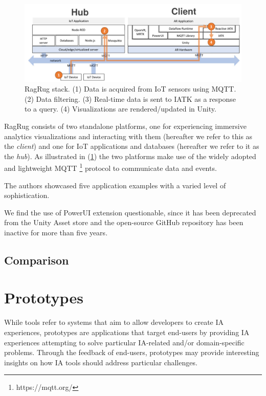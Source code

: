 \documentclass{vgtc}                          %
\begin{document}
\begin{figure}[tb]
	\centering
	\includegraphics[width=\columnwidth]{ragrug_stack}
	\caption[Caption for RagRug]{RagRug stack. (1) Data is acquired from IoT
		sensors using MQTT. (2) Data filtering. (3) Real-time data is sent to
		IATK as a response to a query. (4) Visualizations are
		rendered/updated in Unity.}
	\label{fig:ragrug_stack}
\end{figure}

\medskip

\noindent RagRug consists of two standalone platforms, one for experiencing
immersive analytics visualizations and interacting with them (hereafter we
refer to this as the \textit{client}) and one for IoT applications and
databases (hereafter we refer to it as the \textit{hub}). As illustrated
in (\cref{fig:ragrug_stack}) the two platforms make use of the widely adopted
and lightweight MQTT \footnote{https://mqtt.org/} protocol to communicate
data and events.

\medskip

\noindent The authors showcased five application examples with a varied level of
sophistication.

We find the use of PowerUI extension questionable, since it has been deprecated
from the Unity Asset store and the open-source GitHub repository has been
inactive for more than five years.

\subsection{Comparison}

\section{Prototypes}

While tools refer to systems that aim to allow developers to create IA
experiences, prototypes are applications that target end-users by providing IA
experiences attempting to solve particular IA-related and/or domain-specific
problems. Through the feedback of end-users, prototypes may provide interesting
insights on how IA tools should address particular challenges.
\end{document}
